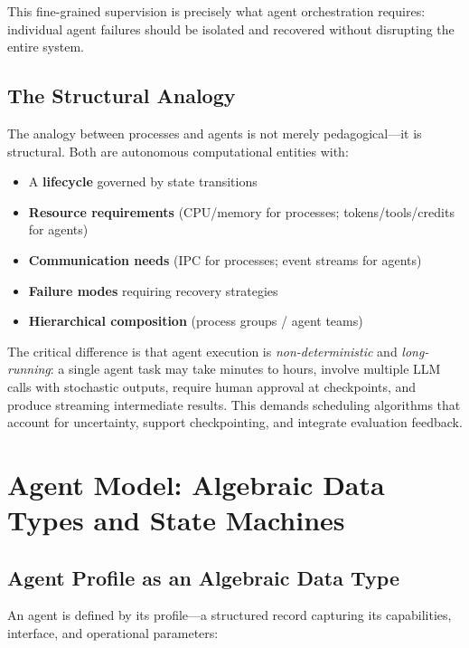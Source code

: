 \documentclass[12pt,a4paper]{article}
\theoremstyle{definition}
\theoremstyle{remark}
\begin{document}
This fine-grained supervision is precisely what agent orchestration requires: individual agent failures should be isolated and recovered without disrupting the entire system.

\subsection{The Structural Analogy}

The analogy between processes and agents is not merely pedagogical---it is structural. Both are autonomous computational entities with:
\begin{itemize}[leftmargin=2em]
  \item A \textbf{lifecycle} governed by state transitions
  \item \textbf{Resource requirements} (CPU/memory for processes; tokens/tools/credits for agents)
  \item \textbf{Communication needs} (IPC for processes; event streams for agents)
  \item \textbf{Failure modes} requiring recovery strategies
  \item \textbf{Hierarchical composition} (process groups / agent teams)
\end{itemize}

The critical difference is that agent execution is \emph{non-deterministic} and \emph{long-running}: a single agent task may take minutes to hours, involve multiple LLM calls with stochastic outputs, require human approval at checkpoints, and produce streaming intermediate results. This demands scheduling algorithms that account for uncertainty, support checkpointing, and integrate evaluation feedback.

\section{Agent Model: Algebraic Data Types and State Machines}\label{sec:agent-model}

\subsection{Agent Profile as an Algebraic Data Type}

An agent is defined by its profile---a structured record capturing its capabilities, interface, and operational parameters:
\end{document}
